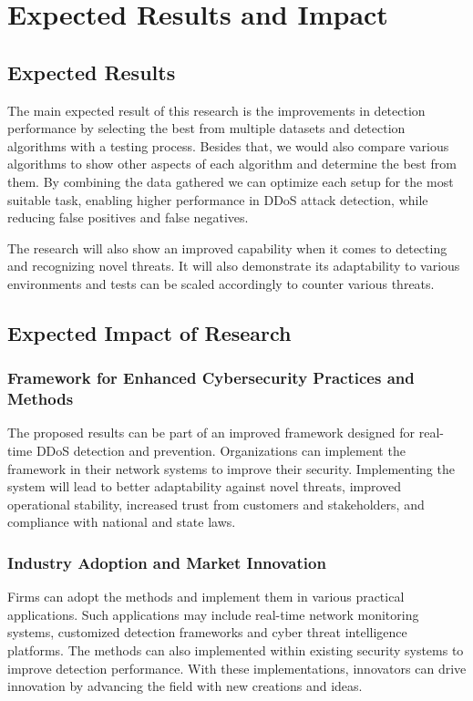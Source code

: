 \documentclass[a4paper, 12pt]{article}
\begin{document}
\clearpage

\section{Expected Results and Impact}

\subsection{Expected Results}
The main expected result of this research is the improvements in detection performance by selecting the best from multiple datasets and detection algorithms with a testing process. Besides that, we would also compare various algorithms to show other aspects of each algorithm and determine the best from them. By combining the data gathered we can optimize each setup for the most suitable task, enabling higher performance in DDoS attack detection, while reducing false positives and false negatives. 

The research will also show an improved capability when it comes to detecting and recognizing novel threats. It will also demonstrate its adaptability to various environments and tests can be scaled accordingly to counter various threats. 

\subsection{Expected Impact of Research}

\subsubsection{ Framework for Enhanced Cybersecurity Practices and Methods }

The proposed results can be part of an improved framework designed for real-time DDoS detection and prevention. Organizations can implement the framework in their network systems to improve their security. Implementing the system will lead to better adaptability against novel threats, improved operational stability, increased trust from customers and stakeholders, and compliance with national and state laws. 

\subsubsection{ Industry Adoption and Market Innovation }

Firms can adopt the methods and implement them in various practical applications. Such applications may include real-time network monitoring systems, customized detection frameworks and cyber threat intelligence platforms. The methods can also implemented within existing security systems to improve detection performance. With these implementations, innovators can drive innovation by advancing the field with new creations and ideas.
\end{document}
